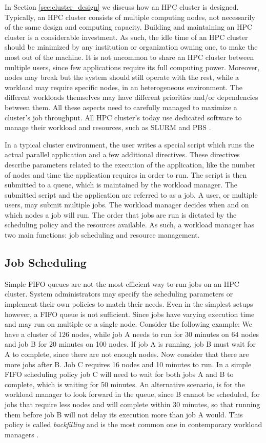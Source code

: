 
In Section \ref{sec:cluster_design} we discuss how an HPC cluster is designed.  Typically,
an HPC cluster consists of multiple computing nodes, not necessarily of the same design
and computing capacity.  Building and maintaining an HPC cluster is a considerable
investment.  As such, the idle time of an HPC cluster should be minimized by any
institution or organization owning one, to make the most out of the machine.  It is not
uncommon to share an HPC cluster between multiple users, since few applications require
its full computing power.  Moreover, nodes may break but the system should still operate
with the rest, while a workload may require specific nodes, in an heterogeneous
environment.  The different workloads themselves may have different priorities and/or
dependencies between them.  All these aspects need to carefully managed to maximize a
cluster's job throughput.  All HPC cluster's today use dedicated software to manage their
workload and resources, such as SLURM \cite{slurm_02} and PBS
\cite{Feng:2007:PUP:1254882.1254906}.

In a typical cluster environment, the user writes a special script which runs the actual
parallel application and a few additional directives.  These directives describe
parameters related to the execution of the application, like the number of nodes and time
the application requires in order to run.  The script is then submitted to a queue, which
is maintained by the workload manager.  The submitted script and the application are
referred to as a job.  A user, or multiple users, may submit multiple jobs.  The workload
manager decides when and on which nodes a job will run.  The order that jobs are run is
dictated by the scheduling policy and the resources available.  As such, a workload
manager has two main functions: job scheduling and resource management.

\subsection{Job Scheduling}
Simple FIFO queues are not the most efficient way to run jobs on an HPC cluster. System
administrators may specify the scheduling parameters or implement their own policies to
match their needs.  Even in the simplest setups however, a FIFO queue is not sufficient.
Since jobs have varying execution time and may run on multiple or a single node.  Consider
the following example:  We have a cluster of 126 nodes, while job A needs to run for 30
minutes on 64 nodes and job B for 20 minutes on 100 nodes.  If job A is running, job B
must wait for A to complete, since there are not enough nodes.  Now consider that there
are more jobs after B.  Job C requires 16 nodes and 10 minutes to run.  In a simple FIFO
scheduling policy job C will need to wait for both jobs A and B to complete, which is
waiting for 50 minutes.  An alternative scenario, is for the workload manager to look
forward in the queue, since B cannot be scheduled, for jobs that require less nodes and
will complete within 30 minutes, so that running them before job B will not delay its
execution more than job A would.  This policy is called \emph{backfilling} and is the most
common one in contemporary workload managers \cite{10.1007/11407522_1}.  

